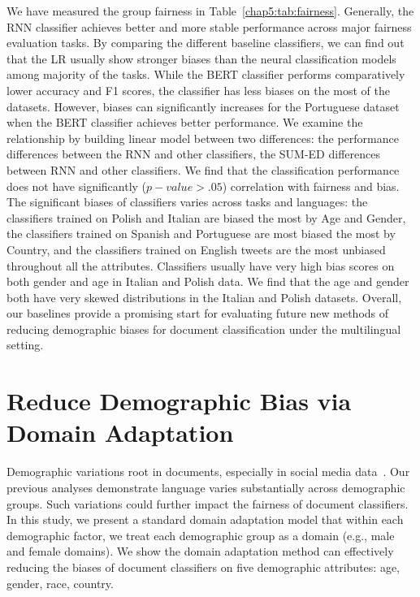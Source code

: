 We have measured the group fairness in Table~\ref{chap5:tab:fairness}. 
Generally, the RNN classifier achieves better and more stable performance across major fairness evaluation tasks.
By comparing the different baseline classifiers, we can find out that the LR usually show stronger biases than the neural classification models among majority of the tasks.
While the BERT classifier performs comparatively lower accuracy and F1 scores, the classifier has less biases on the most of the datasets.
However, biases can significantly increases for the Portuguese dataset when the BERT classifier achieves better performance.
We examine the relationship by building linear model between two differences: the performance differences between the RNN and other classifiers, the SUM-ED differences between RNN and other classifiers.
We find that the classification performance does not have significantly ($p-value > .05$) correlation with fairness and bias.
The significant biases of classifiers varies across tasks and languages: the classifiers trained on Polish and Italian are biased the most by Age and Gender, the classifiers trained on Spanish and Portuguese are most biased the most by Country, and the classifiers trained on English tweets are the most unbiased throughout all the attributes.
Classifiers usually have very high bias scores on both gender and age in Italian and Polish data.
We find that the age and gender both have very skewed distributions in the Italian and Polish datasets. 
Overall, our baselines provide a promising start for evaluating future new methods of reducing demographic biases for document classification under the multilingual setting.


\section{Reduce Demographic Bias via Domain Adaptation}
\label{chap5:sec:adaptation}

Demographic variations root in documents, especially in social media data~\cite{volkova2013exploring,hovy2015demographic}.
Our previous analyses demonstrate language varies substantially across demographic groups.
Such variations could further impact the fairness of document classifiers.
In this study, we present a standard domain adaptation model that within each demographic factor, we treat each demographic group as a domain (e.g., male and female domains).
We show the domain adaptation method can effectively reducing the biases of document classifiers on five demographic attributes: age, gender, race, country.

